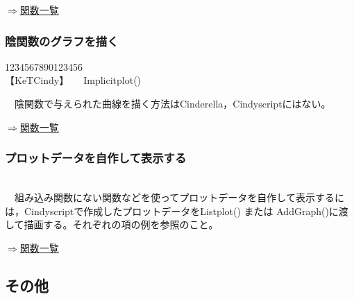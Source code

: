 \documentclass[papersize,a4paper,12pt,uplatex]{jsarticle}
\begin{document}
\begin{flushright} \hyperlink{functionlist3d}{$\Rightarrow$関数一覧}\end{flushright}


\subsubsection{陰関数のグラフを描く}

\begin{tabbing}
12\=34567890123456\=\kill\\

 \>【KeTCindy】　　\>Implicitplot()\\
\end{tabbing}
　陰関数で与えられた曲線を描く方法はCinderella，Cindyscriptにはない。
\begin{flushright} \hyperlink{functionlist3d}{$\Rightarrow$関数一覧}\end{flushright}


\subsubsection{プロットデータを自作して表示する}
　\\
　組み込み関数にない関数などを使ってプロットデータを自作して表示するには，Cindyscriptで作成したプロットデータをListplot() または AddGraph()に渡して描画する。それぞれの項の例を参照のこと。

\begin{flushright} \hyperlink{functionlist3d}{$\Rightarrow$関数一覧}\end{flushright}

\subsection{その他}
\end{document}
